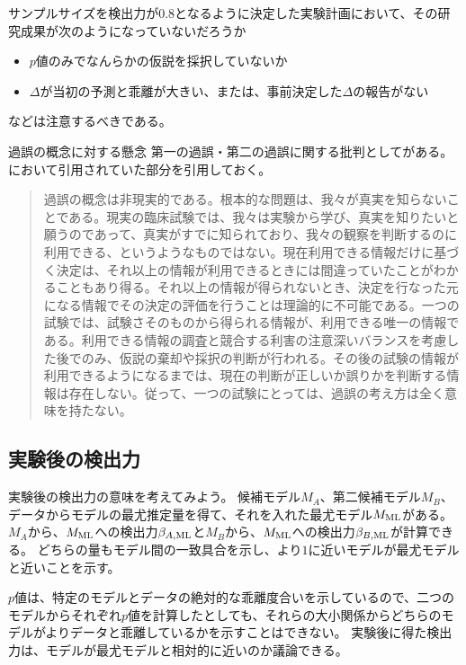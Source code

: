 サンプルサイズを検出力が$0.8$となるように決定した実験計画において、その研究成果が次のようになっていないだろうか
\begin{itemize}
 \item $p$値のみでなんらかの仮説を採択していないか
 \item $\Delta$が当初の予測と乖離が大きい、または、事前決定した$\Delta$の報告がない
\end{itemize}
などは注意するべきである。


\begin{SMbox}{過誤の概念に対する懸念}
第一の過誤・第二の過誤に関する批判として\cite{norleans2004臨床試験のための統計的方法}がある。
\cite{2010毒性試験に用いる統計解析法の動向}において引用されていた部分を引用しておく。
\begin{quote}
過誤の概念は非現実的である。根本的な問題は、我々が真実を知らないことである。現実の臨床試験では、我々は実験から学び、真実を知りたいと願うのであって、真実がすでに知られており、我々の観察を判断するのに利用できる、というようなものではない。現在利用できる情報だけに基づく決定は、それ以上の情報が利用できるときには間違っていたことがわかることもあり得る。それ以上の情報が得られないとき、決定を行なった元になる情報でその決定の評価を行うことは理論的に不可能である。一つの試験では、試験さそのものから得られる情報が、利用できる唯一の情報である。利用できる情報の調査と競合する利害の注意深いバランスを考慮した後でのみ、仮説の棄却や採択の判断が行われる。その後の試験の情報が利用できるようになるまでは、現在の判断が正しいか誤りかを判断する情報は存在しない。従って、一つの試験にとっては、過誤の考え方は全く意味を持たない。
\end{quote}
\end{SMbox}


\subsection{実験後の検出力}
実験後の検出力の意味を考えてみよう。
候補モデル$M_A$、第二候補モデル$M_B$、データからモデルの最尤推定量を得て、それを入れた最尤モデル$M_{\rm{ML}}$がある。
$M_A$から、$M_{\rm{ML}}$への検出力$\beta_{A,\rm{ML}}$と$M_B$から、$M_{\rm{ML}}$への検出力$\beta_{B,\rm{ML}}$が計算できる。
どちらの量もモデル間の一致具合を示し、より$1$に近いモデルが最尤モデルと近いことを示す。

$p$値は、特定のモデルとデータの絶対的な乖離度合いを示しているので、二つのモデルからそれぞれ$p$値を計算したとしても、それらの大小関係からどちらのモデルがよりデータと乖離しているかを示すことはできない。
実験後に得た検出力は、モデルが最尤モデルと相対的に近いのか議論できる。


